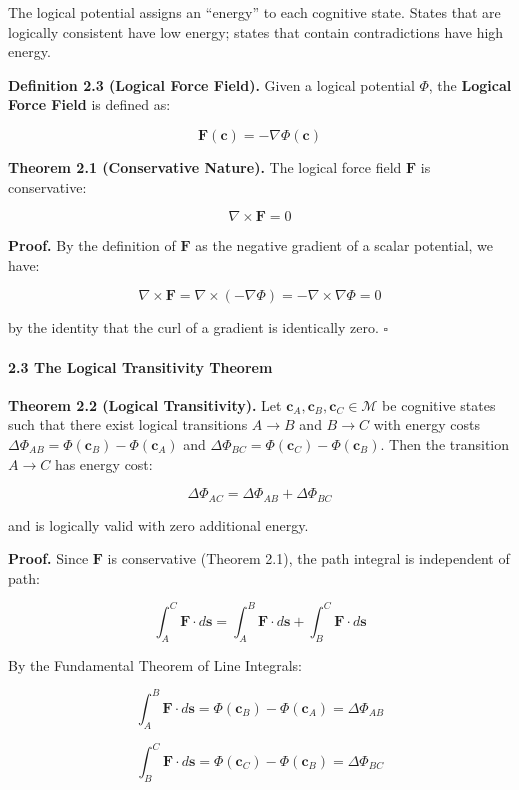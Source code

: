 \documentclass[
  11pt,
  a4paper,
]{article}
\begin{document}
The logical potential assigns an ``energy'' to each cognitive state.
States that are logically consistent have low energy; states that
contain contradictions have high energy.

\textbf{Definition 2.3 (Logical Force Field).} Given a logical potential
\(\Phi\), the \textbf{Logical Force Field} is defined as:

\[\mathbf{F}(\mathbf{c}) = -\nabla \Phi(\mathbf{c})\]

\textbf{Theorem 2.1 (Conservative Nature).} The logical force field
\(\mathbf{F}\) is conservative:

\[\nabla \times \mathbf{F} = 0\]

\textbf{Proof.} By the definition of \(\mathbf{F}\) as the negative
gradient of a scalar potential, we have:

\[\nabla \times \mathbf{F} = \nabla \times (-\nabla \Phi) = -\nabla \times \nabla \Phi = 0\]

by the identity that the curl of a gradient is identically zero.
\(\square\)

\paragraph{2.3 The Logical Transitivity
Theorem}\label{the-logical-transitivity-theorem}

\textbf{Theorem 2.2 (Logical Transitivity).} Let
\(\mathbf{c}_A, \mathbf{c}_B, \mathbf{c}_C \in \mathcal{M}\) be
cognitive states such that there exist logical transitions \(A \to B\)
and \(B \to C\) with energy costs
\(\Delta \Phi_{AB} = \Phi(\mathbf{c}_B) - \Phi(\mathbf{c}_A)\) and
\(\Delta \Phi_{BC} = \Phi(\mathbf{c}_C) - \Phi(\mathbf{c}_B)\). Then the
transition \(A \to C\) has energy cost:

\[\Delta \Phi_{AC} = \Delta \Phi_{AB} + \Delta \Phi_{BC}\]

and is logically valid with zero additional energy.

\textbf{Proof.} Since \(\mathbf{F}\) is conservative (Theorem 2.1), the
path integral is independent of path:

\[\int_A^C \mathbf{F} \cdot d\mathbf{s} = \int_A^B \mathbf{F} \cdot d\mathbf{s} + \int_B^C \mathbf{F} \cdot d\mathbf{s}\]

By the Fundamental Theorem of Line Integrals:

\[\int_A^B \mathbf{F} \cdot d\mathbf{s} = \Phi(\mathbf{c}_B) - \Phi(\mathbf{c}_A) = \Delta \Phi_{AB}\]

\[\int_B^C \mathbf{F} \cdot d\mathbf{s} = \Phi(\mathbf{c}_C) - \Phi(\mathbf{c}_B) = \Delta \Phi_{BC}\]
\end{document}
